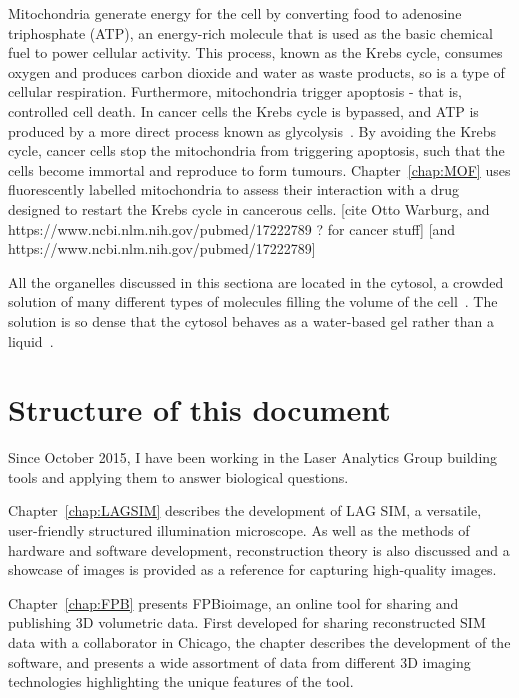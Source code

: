Mitochondria generate energy for the cell by converting food to adenosine triphosphate (ATP), an energy-rich molecule that is used as the basic chemical fuel to power cellular activity. 
This process, known as the Krebs cycle, consumes oxygen and produces carbon dioxide and water as waste products, so is a type of cellular respiration. 
Furthermore, mitochondria trigger apoptosis - that is, controlled cell death. 
In cancer cells the Krebs cycle is bypassed, and ATP is produced by a more direct process known as glycolysis~\cite{warburg1930uber}. 
By avoiding the Krebs cycle, cancer cells stop the mitochondria from triggering apoptosis, such that the cells become immortal and reproduce to form tumours. 
Chapter~\ref{chap:MOF} uses fluorescently labelled  mitochondria to assess their interaction with a drug designed to restart the Krebs cycle in cancerous cells. 
[cite Otto Warburg, and https://www.ncbi.nlm.nih.gov/pubmed/17222789 ? for cancer stuff]
[and https://www.ncbi.nlm.nih.gov/pubmed/17222789]

All the organelles discussed in this sectiona are located in the cytosol, a crowded solution of many different types of molecules filling the volume of the cell~\cite{goodsell1991inside}. 
The solution is so dense that the cytosol behaves as a water-based gel rather than a liquid~\cite{alberts2013essential}. 


\section{Structure of this document}
Since October 2015, I have been working in the Laser Analytics Group building tools and applying them to answer biological questions. 

Chapter~\ref{chap:LAGSIM} describes the development of LAG SIM, a versatile, user-friendly structured illumination microscope. 
As well as the methods of hardware and software development, reconstruction theory is also discussed and a showcase of images is provided as a reference for capturing high-quality images. 

Chapter~\ref{chap:FPB} presents FPBioimage, an online tool for sharing and publishing 3D volumetric data. 
First developed for sharing reconstructed SIM data with a collaborator in Chicago, the chapter describes the development of the software, and presents a wide assortment of data from different 3D imaging technologies highlighting the unique features of the tool. 

